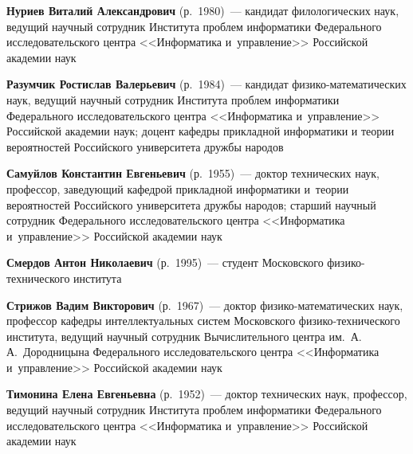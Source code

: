 \begin{multicols}{2}
\vspace*{3pt}


\noindent
\textbf{Нуриев Виталий Александрович} (р.\ 1980)~--- 
кан\-дидат филологических наук, ведущий научный сотруд\-ник Института проб\-лем 
информатики Федерального исследовательского центра <<Информатика и~управ\-ле\-ние>> 
Российской академии наук

\vspace*{3pt}


\noindent
\textbf{Разумчик Ростислав Валерьевич} (р.\ 1984)~--- 
кандидат фи\-зи\-ко-ма\-те\-ма\-ти\-че\-ских наук,
ведущий научный со\-труд\-ник Института проб\-лем информатики Федерального 
исследовательского центра <<Информатика и~управ\-ле\-ние>> 
Российской академии наук; 
доцент кафедры прикладной информатики и тео\-рии вероятностей 
Российского университета дружбы народов


\vspace*{3pt}


\noindent
\textbf{Самуйлов Константин Евгеньевич} (р.\ 1955)~--- 
доктор технических наук, профессор, за\-ве\-ду\-ющий кафедрой прикладной 
информатики и~тео\-рии вероятностей Российского университета дружбы народов; 
старший научный сотрудник Федерального исследовательского центра 
<<Информатика и~управ\-ле\-ние>> Российской академии наук



\columnbreak


\noindent
\textbf{Смердов Антон Николаевич} (р.\ 1995)~--- 
студент Мос\-ков\-ско\-го фи\-зи\-ко-тех\-ни\-че\-ско\-го института


\vspace*{3pt}

\noindent
\textbf{Стрижов Вадим Викторович} (р.\ 1967)~--- 
доктор фи\-зико-ма\-те\-ма\-ти\-че\-ских наук,  профессор
кафедры интеллектуальных систем
Мос\-ков\-ско\-го фи\-зи\-ко-тех\-ни\-че\-ско\-го института,
ведущий научный со\-труд\-ник 
Вычислительного цент\-ра им.\ 
А.\,А.~Дородницына Федерального исследовательского цент\-ра <<Информатика 
и~управ\-ле\-ние>> Российской академии наук


\vspace*{3pt}


\noindent
\textbf{Тимонина Елена Евгеньевна} (р.\ 1952)~--- 
доктор технических наук, профессор, ведущий научный сотруд\-ник 
Института проб\-лем информатики Федерального исследовательского центра 
<<Информатика и~управ\-ле\-ние>> Российской академии наук



\end{multicols}
